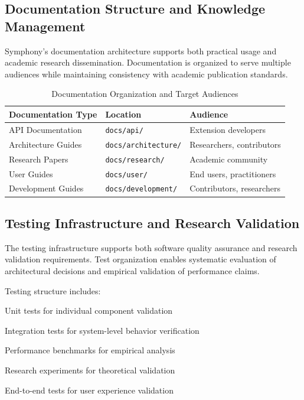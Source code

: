 \subsection*{Documentation Structure and Knowledge Management}

Symphony's documentation architecture supports both practical usage and academic research dissemination. Documentation is organized to serve multiple audiences while maintaining consistency with academic publication standards.

\begin{table}[ht]
\centering
\begin{tabular}{@{}lll@{}}
\toprule
\textbf{Documentation Type} & \textbf{Location} & \textbf{Audience} \\
\midrule
API Documentation & \texttt{docs/api/} & Extension developers \\
Architecture Guides & \texttt{docs/architecture/} & Researchers, contributors \\
Research Papers & \texttt{docs/research/} & Academic community \\
User Guides & \texttt{docs/user/} & End users, practitioners \\
Development Guides & \texttt{docs/development/} & Contributors, researchers \\
\bottomrule
\end{tabular}
\caption{Documentation Organization and Target Audiences}
\end{table}

\subsection*{Testing Infrastructure and Research Validation}

The testing infrastructure supports both software quality assurance and research validation requirements. Test organization enables systematic evaluation of architectural decisions and empirical validation of performance claims.

Testing structure includes:
\begin{compactlist}
    \item Unit tests for individual component validation
    \item Integration tests for system-level behavior verification
    \item Performance benchmarks for empirical analysis
    \item Research experiments for theoretical validation
    \item End-to-end tests for user experience validation
\end{compactlist}


